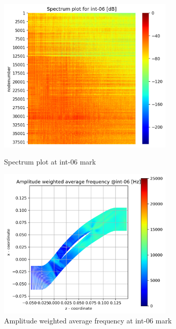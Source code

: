 \begin{figure}[ht]
  \centering
  \includegraphics[width=0.75\textwidth]{Figures/int-06_spectrum.png}
  \caption{Spectrum plot at int-06 mark} \label{int-06-spectrum}
  
  \vspace*{\floatsep}%

  \includegraphics[width=0.75\textwidth]{Figures/int-06-awaf.png}
  \caption{Amplitude weighted average frequency at int-06 mark} \label{int-06-awaf}
\end{figure}
